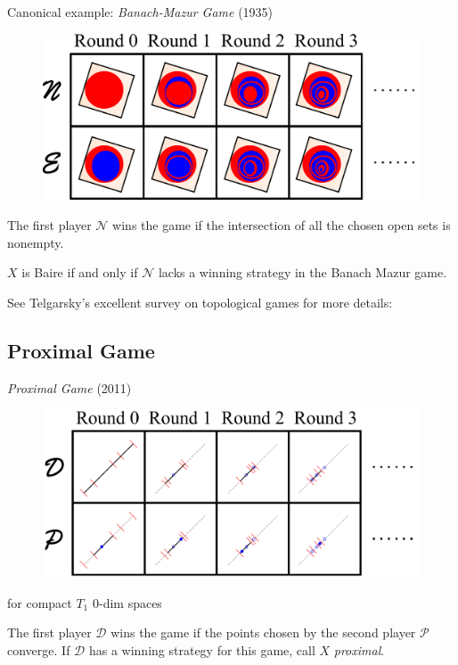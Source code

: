 \documentclass{beamer}
\theoremstyle{definition}
\newcommand{\<}{\langle}
\renewcommand{\>}{\rangle}
\newcommand{\pl}[1]{\mathscr{#1}}
\newcommand{\term}{\textit}
\begin{document}
\begin{frame}
  \small
  Canonical example: \term{Banach-Mazur Game} (1935) \cite{MR666400}

  \begin{figure}
    \includegraphics[width=0.6\linewidth]{bmGame.pdf}
  \end{figure}

  \pause

  The first player $\pl N$ wins the game if the intersection of all the chosen
  open sets is nonempty.

  \pause

  \begin{theorem}
    $X$ is Baire if and only if $\pl N$ lacks a winning strategy
    in the Banach Mazur game.
  \end{theorem}

  See Telgarsky's excellent survey on topological games for more
  details: \cite{MR892457}
\end{frame}


\subsection{Proximal Game}

\begin{frame}
  \term{Proximal Game} (2011)
  \cite{MR3239205}

  \vspacing

  \begin{figure}
    \includegraphics[width=0.8\linewidth]{proximalGame.pdf}
  \end{figure}
  {\tiny for compact $T_1$ $0$-dim spaces}

  \vpause

  The first player $\pl D$ wins the game if the points chosen by the
  second player $\pl P$ converge. If $\pl D$ has a winning
  strategy for this game, call $X$ \term{proximal}.
\end{frame}
\end{document}
